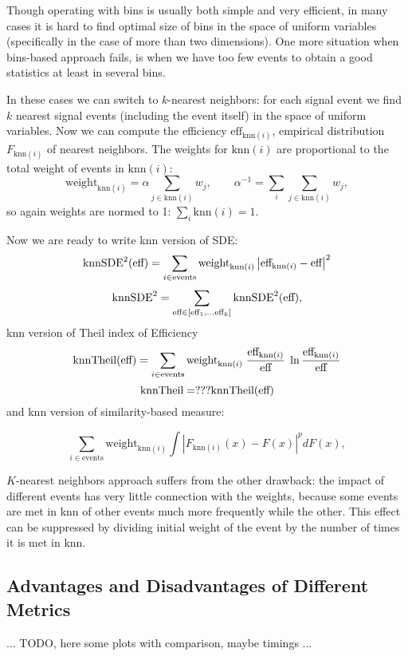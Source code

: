 \documentclass[12pt]{article}
\theoremstyle{definition}
\theoremstyle{remark}
\newcommand{\abs}[1]{\left\vert#1\right\vert}
\begin{document}
\def\knni{\text{knn}(i)}
\def\effknni{\text{eff}_{\knni}}
\def\weightknni{\text{weight}_{\knni}}
\def\Fknn{F_{\knni}}

\def\knnSDE{\text{knnSDE}}

Though operating with bins is usually both simple and very efficient, 
in many cases it is hard to find optimal size of bins in the space of uniform variables (specifically in the case of more than two dimensions).
One more situation when bins-based approach fails, is when we have too few events to obtain a good statistics at least in several bins.

In these cases we can switch to $k$-nearest neighbors: for each signal event we find $k$ nearest signal events (including the event itself) in the space of uniform variables. Now we can compute the efficiency $\effknni$, empirical distribution $\Fknn$ of nearest neighbors. 
The weights for $\knni$ are proportional to the total weight of events in $\knni$:
\[
	\weightknni = \alpha \sum_{j \in \knni} w_j, \qquad \alpha^{-1} = \sum_i \sum_{j \in \knni} w_j,
\]
so again weights are normed to 1: $\sum_{i} \knni = 1$. 

Now we are ready to write knn version of SDE:
\[
	\knnSDE^2(\globaleff)
		= \sum_{i \in \text{events}} \weightknni \abs{\effknni - \globaleff}^2
\]
\[
	\knnSDE^2 = \sum_{\globaleff \in [\globaleff_1, \dots \globaleff_k]}
		\knnSDE^2(\globaleff),
\]
knn version of Theil index of Efficiency
\[
	\text{knnTheil}(\globaleff) = \sum_{i \in \text{events}} \weightknni \; \frac{\effknni}{\globaleff} \; \ln{\frac{\effknni}{\globaleff}}
\]
\[
	\text{knnTheil} = ??? \text{knnTheil}(\text{eff})
\]
and knn version of similarity-based measure:

\[
	 \sum_{i \in \text{events}} \weightknni \int \abs{\Fknn(x) - F(x)}^p dF(x),
\]


$K$-nearest neighbors approach suffers from the other drawback: the impact of different events has very little connection with the weights, because some events are met in knn of other events much more frequently while the other.
This effect can be suppressed by dividing initial weight of the event by the number of times it is met in knn. 




\subsection{Advantages and Disadvantages of Different Metrics}

... TODO, here some plots with comparison, maybe timings ...
\end{document}

